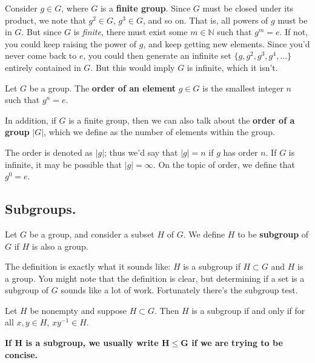 {\color{MidnightBlue}
Consider $g \in G$, where $G$ is a \textbf{finite group}. Since $G$ must be
closed under its product, we note that $g^2 \in G$, $g^3 \in G$, and so
on. That is, all powers of $g$ must be in $G$. But since $G$ is
\textit{finite}, there must exist some $m \in
\mathbb{N}$ such that $g^m = e$. If not, you could keep raising the
power of $g$, and keep getting new elements. Since you'd never come
back to $e$, you could then generate an infinite set
$\{g, g^2, g^3, g^4, \dots\}$ entirely contained in $G$. But this
would imply $G$ is infinite, which it isn't.}

\noindent
\begin{definition}
    Let $G$ be a group. The \textbf{order of an element} $g \in G$ is
    the smallest integer $n$ such that $g^n = e$. 

    In addition, if $G$ is a finite group, then we can also talk about
    the \textbf{order of a group} $|G|$, which we define as the number of
    elements within the group.
    
    The order is denoted
    as $|g|$; thus we'd say that $|g| = n$ if $g$ has order $n$. If
    $G$ is infinite, it may be possible that $|g| = \infty$. On the
    topic of order, we define that $g^0 = e$.
\end{definition}
\subsection*{Subgroups.}
    \begin{definition}
        Let $G$ be a group, and consider a subset $H$ of $G$. We define
    $H$ to be \textbf{subgroup} of $G$ if $H$ is also a group.
    \end{definition}
    
    {\color{blue}The definition is exactly what it sounds like: $H$ is a subgroup
    if $H \subset G$ and $H$ is a group. You might note that the
    definition is clear, but determining if a set is a subgroup of $G$
    sounds like a lot of work. Fortunately there's the subgroup test.
    }

    \begin{thm}\label{subgroup_test}
        Let $H$ be nonempty and suppose $H \subset G$. Then $H$ is a
        subgroup if and only if for all $x, y \in H$, $xy^{-1} \in H$.
    \end{thm}

    
    

    \noindent \textbf{If $\mathbf{H}$ is a subgroup, we usually write $\mathbf{H \le G}$ if we
    are trying to be concise.}

